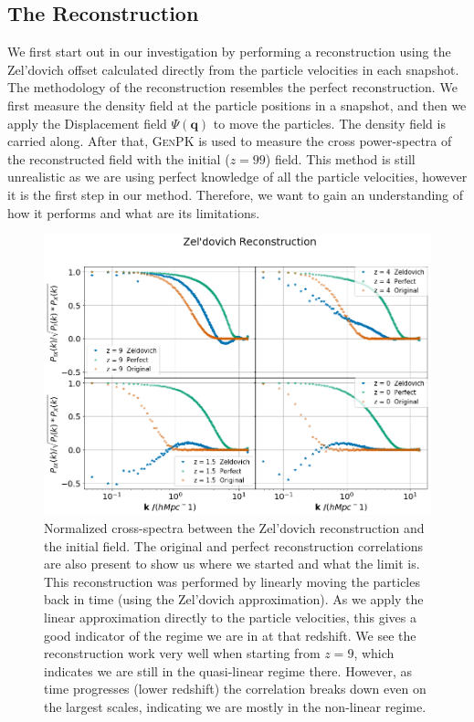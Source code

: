 \subsection{The Reconstruction}

We first start out in our investigation by performing a reconstruction using the Zel'dovich offset calculated directly from the particle velocities in each snapshot. The methodology of the reconstruction resembles the perfect reconstruction. We first measure the density field at the particle positions in a snapshot, and then we apply the Displacement field $\Psi(\textbf{q})$ to move the particles. The density field is carried along. After that, \textsc{GenPK} is used to measure the cross power-spectra of the reconstructed field with the initial ($z=99$) field. This method is still unrealistic as we are using perfect knowledge of all the particle velocities, however it is the first step in our method. Therefore, we want to gain an understanding of how it performs and what are its limitations.

\begin{figure}
    \centering
    \includegraphics[width=1\columnwidth]{images/realRecon/zeld.png}%
    
    \caption{
    Normalized cross-spectra between the Zel'dovich reconstruction and the initial field. The original and perfect reconstruction correlations are also present to show us where we started and what the limit is. This reconstruction was performed by linearly moving the particles back in time (using the Zel'dovich approximation). As we apply the linear approximation directly to the particle velocities, this gives a good indicator of the regime we are in at that redshift. We see the reconstruction work very well when starting from $z=9$, which indicates we are still in the quasi-linear regime there. However, as time progresses (lower redshift) the correlation breaks down even on the largest scales, indicating we are mostly in the non-linear regime. 
    }
    
    \label{fig:4.1}
\end{figure}

